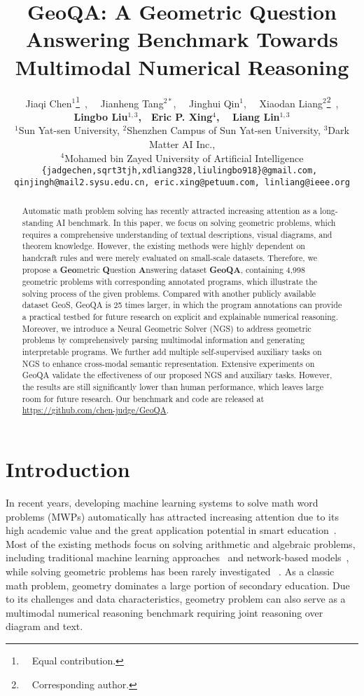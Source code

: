 \documentclass[11pt,a4paper]{article}
\title{GeoQA: A Geometric Question Answering Benchmark Towards Multimodal Numerical Reasoning}
\author{Jiaqi Chen$^{1}$\thanks{~~Equal contribution.}~,~~ Jianheng Tang$^{2\ast}$,~~ Jinghui Qin$^{1}$,~~ Xiaodan Liang$^{2}$\thanks{~~Corresponding author.}~, \\ 
{\bf Lingbo Liu}$^{1,3}${\bf ,}~~{\bf Eric P. Xing}$^{4}${\bf ,}~~ {\bf Liang Lin}$^{1,3}$ \\
{\small $^1$Sun Yat-sen University, $^2$Shenzhen Campus of Sun Yat-sen University, $^3$Dark Matter AI Inc., } \\
{\small $^4$Mohamed bin Zayed University of Artificial Intelligence}\\
{\small\texttt{\{jadgechen,sqrt3tjh,xdliang328,liulingbo918\}@gmail.com, }}\\
{\small\texttt{qinjingh@mail2.sysu.edu.cn, eric.xing@petuum.com, linliang@ieee.org}}
}
\begin{document}
\maketitle
\begin{abstract}


Automatic math problem solving has recently attracted increasing attention as a long-standing AI benchmark. In this paper, we focus on solving geometric problems, which requires a comprehensive understanding of textual descriptions, visual diagrams, and theorem knowledge. However, the existing methods were highly dependent on handcraft rules and were merely evaluated on small-scale datasets.
Therefore, we propose a \textbf{Geo}metric \textbf{Q}uestion \textbf{A}nswering dataset \textbf{GeoQA}, containing 4,998 geometric problems with corresponding annotated programs, which illustrate the solving process of the given problems. Compared with another publicly available dataset GeoS, GeoQA is 25 times larger, in which the program annotations can provide a practical testbed for future research on explicit and explainable numerical reasoning.
Moreover, we introduce a Neural Geometric Solver (NGS) to address geometric problems by comprehensively parsing multimodal information and generating interpretable programs. We further add multiple self-supervised auxiliary tasks on NGS to enhance cross-modal semantic representation.
Extensive experiments on GeoQA validate the effectiveness of our proposed NGS and auxiliary tasks. However, the results are still significantly lower than human performance, which leaves large room for future research.
Our benchmark and code are released at \href{https://github.com/chen-judge/GeoQA}{https://github.com/chen-judge/GeoQA}.


\end{abstract}



\section{Introduction}





In recent years, developing machine learning systems to solve math word problems (MWPs) automatically has attracted increasing attention due to its high academic value and the great application potential in smart education~\cite{bajaj2018smart,lin2018intelligent}. Most of the existing methods focus on solving arithmetic and algebraic problems, including traditional machine learning approaches~\cite{kushman2014learning, zhou-etal-2015-learn, huang-etal-2016-well} and network-based models~\cite{dns, seq2et, seq2tree}, while solving geometric problems has been rarely investigated ~\cite{seo2014diagram,seo2015solving,sachan2017textbooks}. 
As a classic math problem, geometry dominates a large portion of  secondary education. Due to its challenges and data characteristics, geometry problem can also serve as a multimodal numerical reasoning benchmark requiring joint reasoning over diagram and text.
\end{document}
